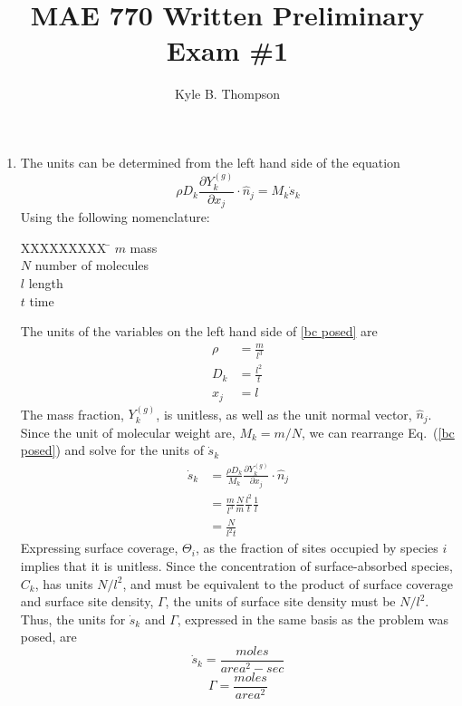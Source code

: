 \documentclass[a4paper]{report}
\title{MAE 770 Written Preliminary Exam \#1}
\author{ Kyle B. Thompson }
\newcommand{\eref}[1]{Eq.~(\ref{#1})}
\newcommand{\sk}{\dot{s}_k}
\begin{document}
\maketitle
\begin{enumerate}
  \item The units can be determined from the left hand side of the equation
    \begin{equation}
      \rho D_k \frac{\partial Y_k^{(g)}}{\partial x_j} \cdot \hat{n}_j = M_k \sk
      \label{bc posed}
    \end{equation}
  Using the following nomenclature:
  \begin{tabbing}
    XXXXXXXXX \= \kill%
    $m$ \> mass \\
    $N$ \> number of molecules \\
    $l$ \> length \\
    $t$ \> time
  \end{tabbing}
  The units of the variables on the left hand side of \ref{bc posed} are
  \begin{align*}
    \rho &= \frac{m}{l^3} \\
    D_k &= \frac{l^2}{t} \\
    x_j &= l
  \end{align*}
  The mass fraction, $Y_k^{(g)}$, is unitless, as well as the unit normal vector,
  $\hat{n}_j$. Since the unit of molecular weight are, $M_k = m/N$, we can
  rearrange \eref{bc posed} and solve for the units of $\sk$
  \begin{equation}
    \label{units sdot}
    \begin{aligned}
      \sk &= \frac{\rho D_k}{M_k}\frac{\partial Y_k^{(g)}}{\partial x_j}\cdot \hat{n}_j \\
      &= \frac{m}{l^3} \frac{N}{m} \frac{l^2}{t}\frac{1}{l} \\
      &= \frac{N}{l^2 t}
    \end{aligned}
  \end{equation}
  Expressing surface coverage, $\Theta_i$, as the fraction of sites occupied by
  species $i$ implies that it is unitless.  Since the concentration of
  surface-absorbed species, $C_k$, has units $N/l^2$, and must be equivalent to
  the product of surface coverage and surface site density, $\Gamma$, the units
  of surface site density must be $N/l^2$.  Thus, the units for $\sk$ and
  $\Gamma$, expressed in the same basis as the problem was posed, are
  \[
    \boxed{\sk = \frac{moles}{area^2-sec}}
  \]
  \[
    \boxed{\Gamma = \frac{moles}{area^2}}
  \]


\end{enumerate}
\end{document}
